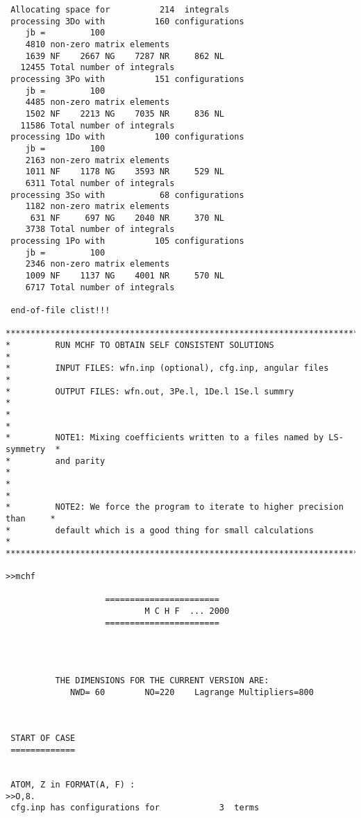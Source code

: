 \documentclass[fleqn,10pt]{book}
\begin{document}
\begin{verbatim}
 Allocating space for          214  integrals
 processing 3Do with          160 configurations
    jb =         100
    4810 non-zero matrix elements
    1639 NF    2667 NG    7287 NR     862 NL
   12455 Total number of integrals
 processing 3Po with          151 configurations
    jb =         100
    4485 non-zero matrix elements
    1502 NF    2213 NG    7035 NR     836 NL
   11586 Total number of integrals
 processing 1Do with          100 configurations
    jb =         100
    2163 non-zero matrix elements
    1011 NF    1178 NG    3593 NR     529 NL
    6311 Total number of integrals
 processing 3So with           68 configurations
    1182 non-zero matrix elements
     631 NF     697 NG    2040 NR     370 NL
    3738 Total number of integrals
 processing 1Po with          105 configurations
    jb =         100
    2346 non-zero matrix elements
    1009 NF    1137 NG    4001 NR     570 NL
    6717 Total number of integrals

 end-of-file clist!!!

*******************************************************************************
*         RUN MCHF TO OBTAIN SELF CONSISTENT SOLUTIONS                        *
*         INPUT FILES: wfn.inp (optional), cfg.inp, angular files             *
*         OUTPUT FILES: wfn.out, 3Pe.l, 1De.l 1Se.l summry                    *
*                                                                             *
*         NOTE1: Mixing coefficients written to a files named by LS-symmetry  *
*         and parity                                                          *
*                                                                             *
*         NOTE2: We force the program to iterate to higher precision than     *
*         default which is a good thing for small calculations                *
*******************************************************************************

>>mchf

                    =======================
                            M C H F  ... 2000   
                    =======================




          THE DIMENSIONS FOR THE CURRENT VERSION ARE:
             NWD= 60        NO=220    Lagrange Multipliers=800



 START OF CASE
 =============


 ATOM, Z in FORMAT(A, F) : 
>>O,8.
 cfg.inp has configurations for            3  terms


\end{verbatim}
\end{document}
